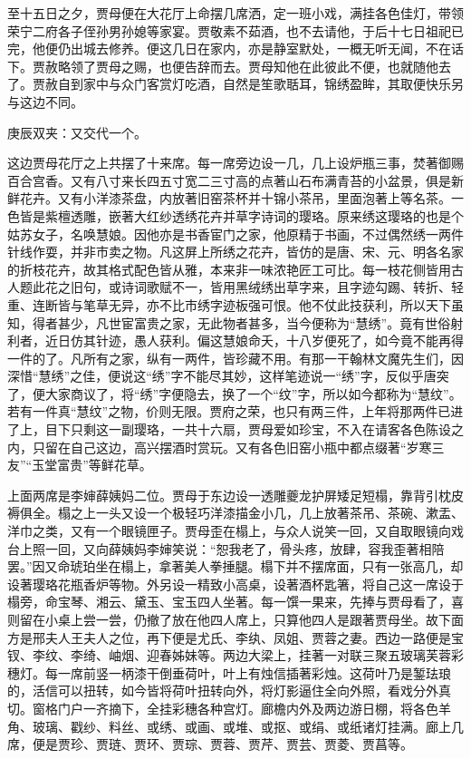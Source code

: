\begin{parag}
    至十五日之夕，贾母便在大花厅上命摆几席洒，定一班小戏，满挂各色佳灯，带领荣宁二府各子侄孙男孙媳等家宴。贾敬素不茹酒，也不去请他，于后十七日祖祀已完，他便仍出城去修养。便这几日在家内，亦是静室默处，一概无听无闻，不在话下。贾赦略领了贾母之赐，也便告辞而去。贾母知他在此彼此不便，也就随他去了。贾赦自到家中与众门客赏灯吃酒，自然是笙歌聒耳，锦绣盈眸，其取便快乐另与这边不同。\begin{note}庚辰双夹：又交代一个。\end{note}
\end{parag}


\begin{parag}
    这边贾母花厅之上共摆了十来席。每一席旁边设一几，几上设炉瓶三事，焚著御赐百合宫香。又有八寸来长四五寸宽二三寸高的点著山石布满青苔的小盆景，俱是新鲜花卉。又有小洋漆茶盘，内放著旧窑茶杯并十锦小茶吊，里面泡著上等名茶。一色皆是紫檀透雕，嵌著大红纱透绣花卉并草字诗词的璎珞。原来绣这璎珞的也是个姑苏女子，名唤慧娘。因他亦是书香宦门之家，他原精于书画，不过偶然绣一两件针线作耍，并非市卖之物。凡这屏上所绣之花卉，皆仿的是唐、宋、元、明各名家的折枝花卉，故其格式配色皆从雅，本来非一味浓艳匠工可比。每一枝花侧皆用古人题此花之旧句，或诗词歌赋不一，皆用黑绒绣出草字来，且字迹勾踢、转折、轻重、连断皆与笔草无异，亦不比市绣字迹板强可恨。他不仗此技获利，所以天下虽知，得者甚少，凡世宦富贵之家，无此物者甚多，当今便称为“慧绣”。竟有世俗射利者，近日仿其针迹，愚人获利。偏这慧娘命夭，十八岁便死了，如今竟不能再得一件的了。凡所有之家，纵有一两件，皆珍藏不用。有那一干翰林文魔先生们，因深惜“慧绣”之佳，便说这“绣”字不能尽其妙，这样笔迹说一“绣”字，反似乎唐突了，便大家商议了，将“绣”字便隐去，换了一个“纹”字，所以如今都称为“慧纹”。若有一件真“慧纹”之物，价则无限。贾府之荣，也只有两三件，上年将那两件已进了上，目下只剩这一副璎珞，一共十六扇，贾母爱如珍宝，不入在请客各色陈设之内，只留在自己这边，高兴摆酒时赏玩。又有各色旧窑小瓶中都点缀著“岁寒三友”“玉堂富贵”等鲜花草。
\end{parag}


\begin{parag}
    上面两席是李婶薛姨妈二位。贾母于东边设一透雕夔龙护屏矮足短榻，靠背引枕皮褥俱全。榻之上一头又设一个极轻巧洋漆描金小几，几上放著茶吊、茶碗、漱盂、洋巾之类，又有一个眼镜匣子。贾母歪在榻上，与众人说笑一回，又自取眼镜向戏台上照一回，又向薛姨妈李婶笑说：“恕我老了，骨头疼，放肆，容我歪著相陪罢。”因又命琥珀坐在榻上，拿著美人拳捶腿。榻下并不摆席面，只有一张高几，却设著璎珞花瓶香炉等物。外另设一精致小高桌，设著酒杯匙箸，将自己这一席设于榻旁，命宝琴、湘云、黛玉、宝玉四人坐著。每一馔一果来，先捧与贾母看了，喜则留在小桌上尝一尝，仍撤了放在他四人席上，只算他四人是跟著贾母坐。故下面方是邢夫人王夫人之位，再下便是尤氏、李纨、凤姐、贾蓉之妻。西边一路便是宝钗、李纹、李绮、岫烟、迎春姊妹等。两边大梁上，挂著一对联三聚五玻璃芙蓉彩穗灯。每一席前竖一柄漆干倒垂荷叶，叶上有烛信插著彩烛。这荷叶乃是錾珐琅的，活信可以扭转，如今皆将荷叶扭转向外，将灯影逼住全向外照，看戏分外真切。窗格门户一齐摘下，全挂彩穗各种宫灯。廊檐内外及两边游日棚，将各色羊角、玻璃、戳纱、料丝、或绣、或画、或堆、或抠、或绢、或纸诸灯挂满。廊上几席，便是贾珍、贾琏、贾环、贾琮、贾蓉、贾芹、贾芸、贾菱、贾菖等。
\end{parag}


